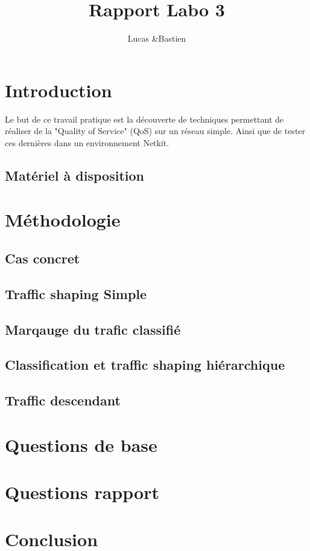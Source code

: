 \documentclass{article}
\title{Rapport Labo 3}
\author{Lucas \bsc{Bulloni} \&Bastien \bsc{Wermeille}}
\begin{document}
\maketitle

\section{Introduction}
 Le but de ce travail pratique est la découverte de techniques permettant de réaliser de la "Quality of Service" (QoS) sur un réseau simple. Ainsi que de tester ces dernières dans un environnement Netkit.

\subsection{Matériel à disposition}


\section{Méthodologie}

\subsection{Cas concret}

\subsection{Traffic shaping Simple}

\subsection{Marqauge du trafic classifié}

\subsection{Classification et traffic shaping hiérarchique}

\subsection{Traffic descendant}

\section{Questions de base}

\section{Questions rapport}




\section{Conclusion}
\end{document}

